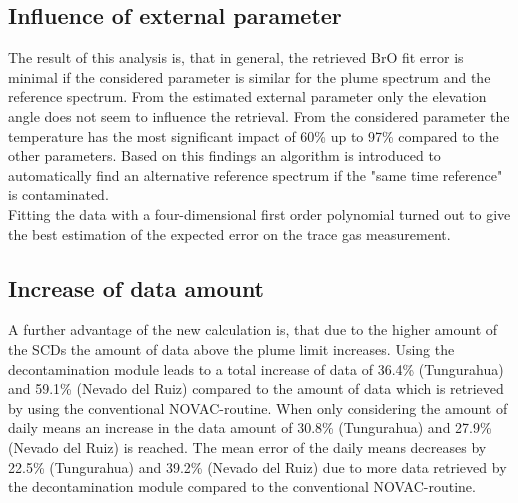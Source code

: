\documentclass  [
  paper    = a4,
  BCOR     = 10mm,
  twoside,
  fontsize = 12pt,
  fleqn,
  toc      = bibnumbered,
  toc      = listofnumbered,
  numbers  = noendperiod,
  headings = normal,
  listof   = leveldown,
  version  = 3.03
]                                       {scrreprt}
\begin{document}
\subsection*{Influence of external parameter} 
The result of this analysis is, that in general, the retrieved BrO fit error is minimal if the considered parameter is similar for the plume spectrum and the reference spectrum. From the estimated external parameter only the elevation angle does not seem to influence the retrieval. From the considered parameter the temperature has the most significant impact of 60\% up to 97\% compared to the other parameters.
Based on this findings an algorithm is introduced to automatically find an alternative reference spectrum if the "same time reference" is contaminated.\\
Fitting the data with a four-dimensional first order polynomial turned out to give the best estimation of the expected error on the trace gas measurement.
%
\subsection*{Increase of data amount} 
A further advantage of the new calculation is, that due to the higher amount of the  SCDs the amount of data above the plume limit increases. Using the decontamination module leads to a total increase of data of 36.4\% (Tungurahua) and 59.1\% (Nevado del Ruiz) compared to the amount of data which is retrieved by using the conventional NOVAC-routine. When only considering the amount of daily means an increase in the data amount of 30.8\% (Tungurahua) and 27.9\% (Nevado del Ruiz) is reached. The mean error of the daily means decreases by 22.5\% (Tungurahua) and 39.2\% (Nevado del Ruiz) due to more data retrieved by the decontamination module compared to the conventional NOVAC-routine.
%
\end{document}
